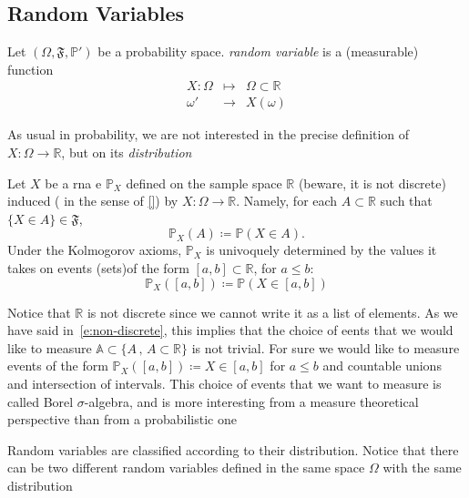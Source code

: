 \subsection{Random Variables}
	
	\begin{definition}
		\label{d:random_variable}
		Let $(\Omega ,\mathfrak F , \mathbb P')$ be a probability space.  \emph{random variable } is a (measurable) function 
		\begin{equation}
			\label{e:rv}
			\begin{array}{ccc}
			X: \Omega & \mapsto & \Omega \subset \mathbb R\\
			\omega' & \to & X(\omega)
			\end{array}
		\end{equation}
	\end{definition}
	As usual in probability, we are not interested in the precise definition of $X: \Omega \to \mathbb R$, but on its  \emph{distribution}
	\begin{definition}
		\label{d:distr}
		Let $X$ be a rna e $\mathbb P_X$ defined on the sample space $\mathbb R$ (beware, it is not discrete) induced ( in the sense of \eqref{}) by $X: \Omega \to \mathbb R$. Namely, for each $A \subset \mathbb R$ such that $\{ X \in A\} \in \mathfrak F$,
	\begin{equation}	
		\label{e:distr}
		\mathbb P_X(A) \coloneqq \mathbb P(X \in A).
	\end{equation}   
	Under the Kolmogorov axioms, $\mathbb P_X$ is univoquely determined by the values it takes on events (sets)of the form $[a,b] \subset \mathbb R $, for $a \leq b$: 
	\begin{equation}
		\label{e:distr_interval}
		\mathbb P_X([a,b]) \coloneq \mathbb P(X \in [a,b])
	\end{equation}	
	
	\end{definition} 


	\begin{remark}
		Notice that $\mathbb R$ is not discrete since we cannot write it as a list of elements. As we have said  in~\ref{e:non-discrete}, this implies that the choice of eents that we would like to measure $\mathbb A \subset\{A\,, \, A \subset \mathbb R\}$ is not trivial. For sure we would like to measure events of the form $\mathbb P_X([a,b]) \coloneq X \in [a,b]$ for $a \leq b$ and countable unions and intersection of intervals. This choice of events that we want to measure is called Borel $\sigma$-algebra, and is more interesting from a measure theoretical perspective than from a probabilistic one 
	\end{remark}
	Random variables are classified according to their distribution. Notice that there can be two different random variables defined in the same space $\Omega$ with the same distribution
	
